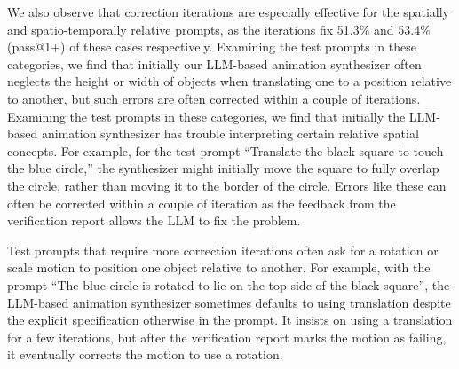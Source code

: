 We also observe that correction iterations are especially effective
for the spatially and spatio-temporally relative prompts, as the
iterations fix 51.3\% and 53.4\% (pass@1+) of these cases
respectively.
%
Examining the test prompts in these categories, we find that
initially our LLM-based animation synthesizer often neglects the
height or width of objects when translating one to a position relative
to another, but such errors are often corrected within a couple of iterations.
%
Examining the test prompts in these categories, we find that
initially the LLM-based animation synthesizer
has trouble interpreting
certain relative spatial concepts. %
For example, for the test prompt ``Translate the black square to touch
the blue circle,'' the synthesizer might initially move the square to
fully overlap the circle, rather than moving it to the border of the circle.
Errors like these can often be corrected within a
couple of iteration as the feedback from the verification report allows
the LLM to fix the problem.
%

%
Test prompts that require more correction iterations often ask for a
rotation or scale motion to position one object relative to another.
For example, with the prompt ``The blue circle is rotated to lie
on the top side of the black square'',  the LLM-based
animation synthesizer sometimes defaults to using translation despite
the explicit specification otherwise in the prompt.
%
It insists on using a translation for a few iterations, but after the
verification report marks the motion as failing, it eventually
corrects the motion to use a rotation.
%


